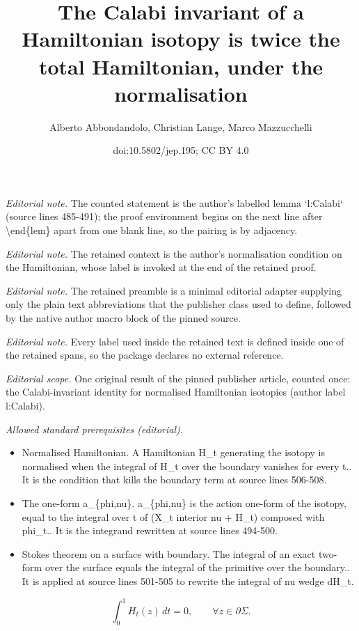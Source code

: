 \documentclass[10pt,a4paper]{article}
\title{The Calabi invariant of a Hamiltonian isotopy is twice the total Hamiltonian, under the normalisation}
\author{Alberto Abbondandolo, Christian Lange, Marco Mazzucchelli}
\date{doi:10.5802/jep.195; CC BY 4.0}
\theoremstyle{definition}
\begin{document}
\maketitle
\noindent\textit{Editorial note.} The counted statement is the author's labelled lemma `l:Calabi` (source lines 485-491); the proof environment begins on the next line after \textbackslash{}end\{lem\} apart from one blank line, so the pairing is by adjacency.\par\medskip
\noindent\textit{Editorial note.} The retained context is the author's normalisation condition on the Hamiltonian, whose label is invoked at the end of the retained proof.\par\medskip
\noindent\textit{Editorial note.} The retained preamble is a minimal editorial adapter supplying only the plain text abbreviations that the publisher class used to define, followed by the native author macro block of the pinned source.\par\medskip
\noindent\textit{Editorial note.} Every label used inside the retained text is defined inside one of the retained spans, so the package declares no external reference.\par\medskip
\noindent\textit{Editorial scope.} One original result of the pinned publisher article, counted once: the Calabi-invariant identity for normalised Hamiltonian isotopies (author label l:Calabi).\par\medskip
\noindent\textit{Allowed standard prerequisites (editorial).}\begin{itemize}
\item Normalised Hamiltonian. A Hamiltonian H\_t generating the isotopy is normalised when the integral of H\_t over the boundary vanishes for every t.. It is the condition that kills the boundary term at source lines 506-508.
\item The one-form a\_\{phi,nu\}. a\_\{phi,nu\} is the action one-form of the isotopy, equal to the integral over t of (X\_t interior nu + H\_t) composed with phi\_t.. It is the integrand rewritten at source lines 494-500.
\item Stokes theorem on a surface with boundary. The integral of an exact two-form over the surface equals the integral of the primitive over the boundary.. It is applied at source lines 501-505 to rewrite the integral of nu wedge dH\_t.
\end{itemize}\medskip
\begin{equation}
\label{norm1}
\int_0^1 H_t(z)\, dt = 0, \qquad \forall z\in \partial \Sigma.
\end{equation}
\end{document}
